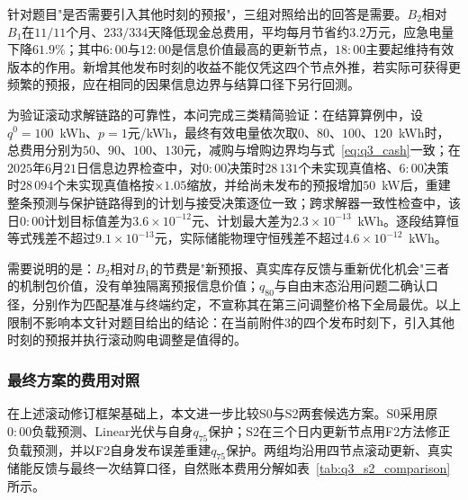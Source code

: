 \documentclass[12pt,a4paper]{ctexart}
\theoremstyle{definition}
\theoremstyle{plain}
\theoremstyle{remark}
\begin{document}
针对题目"是否需要引入其他时刻的预报"，三组对照给出的回答是需要。$B_2$相对$B_1$在$11/11$个月、$233/334$天降低现金总费用，平均每月节省约$3.2$万元，应急电量下降$61.9\%$；其中$6{:}00$与$12{:}00$是信息价值最高的更新节点，$18{:}00$主要起维持有效版本的作用。新增其他发布时刻的收益不能仅凭这四个节点外推，若实际可获得更频繁的预报，应在相同的因果信息边界与结算口径下另行回测。

为验证滚动求解链路的可靠性，本问完成三类精简验证：在结算算例中，设$q^{0}=100$~kWh、$p=1$元/kWh，最终有效电量依次取$0$、$80$、$100$、$120$~kWh时，总费用分别为$50$、$90$、$100$、$130$元，减购与增购边界均与式~\eqref{eq:q3_cash}一致；在$2025$年$6$月$21$日信息边界检查中，对$0{:}00$决策时$28\,131$个未实现真值格、$6{:}00$决策时$28\,094$个未实现真值格按$\times1.05$缩放，并给尚未发布的预报增加$50$~kW后，重建整条预测与保护链路得到的计划与接受决策逐位一致；跨求解器一致性检查中，该日$0{:}00$计划目标值差为$3.6\times10^{-12}$元、计划最大差为$2.3\times10^{-13}$~kWh。逐段结算恒等式残差不超过$9.1\times10^{-13}$元，实际储能物理守恒残差不超过$4.6\times10^{-12}$~kWh。

需要说明的是：$B_2$相对$B_1$的节费是"新预报、真实库存反馈与重新优化机会"三者的机制包价值，没有单独隔离预报信息价值；$q_{80}$与自由末态沿用问题二确认口径，分别作为匹配基准与终端约定，不宣称其在第三问调整价格下全局最优。以上限制不影响本文针对题目给出的结论：在当前附件3的四个发布时刻下，引入其他时刻的预报并执行滚动购电调整是值得的。

\subsubsection{最终方案的费用对照}

在上述滚动修订框架基础上，本文进一步比较S0与S2两套候选方案。S0采用原$0{:}00$负载预测、Linear光伏与自身$q_{75}$保护；S2在三个日内更新节点用F2方法修正负载预测，并以F2自身发布误差重建$q_{75}$保护。两组均沿用四节点滚动更新、真实储能反馈与最终一次结算口径，自然账本费用分解如表~\ref{tab:q3_s2_comparison}所示。

\begin{table}[H]
\centering
\caption{问题三S0与S2方案的全年费用与应急指标}
\label{tab:q3_s2_comparison}
\end{table}
\end{document}
